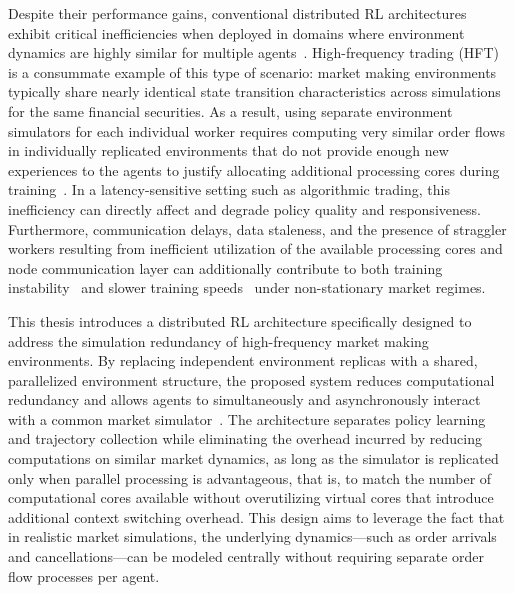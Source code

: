Despite their performance gains, conventional distributed RL architectures exhibit critical inefficiencies when
deployed in domains where environment dynamics are highly similar for multiple agents~\citep{AlSaffar2023,Lu2024}.
High-frequency trading (HFT) is a consummate example of this type of scenario: market making environments typically share nearly
identical state transition characteristics across simulations for the same financial securities.
As a result, using separate environment simulators for each individual worker requires computing very similar order flows 
in individually replicated environments that do not provide enough new experiences to the agents 
to justify allocating additional processing cores during training~\citep{Hou2025}.
In a latency-sensitive setting such as algorithmic trading, 
this inefficiency can directly affect and degrade policy quality and responsiveness.
Furthermore, communication delays, data staleness, and the presence of straggler workers 
resulting from inefficient utilization of the available processing cores and node communication layer
can additionally contribute to both training instability~\citep{He2022,Xie2023} 
and slower training speeds~\citep{Borzilov2025} under non-stationary market regimes.

This thesis introduces a distributed RL architecture specifically designed to address the simulation 
redundancy of high-frequency market making environments.
By replacing independent environment replicas with a shared, parallelized environment structure,
the proposed system reduces computational redundancy and allows agents to simultaneously and 
asynchronously interact with a common market simulator~\citep{Yin2024,Hou2025}.
The architecture separates policy learning and trajectory collection while eliminating the overhead 
incurred by reducing computations on similar market dynamics, 
as long as the simulator is replicated only when parallel processing is advantageous, that is,
to match the number of computational cores available without overutilizing virtual cores that introduce additional context switching overhead.
This design aims to leverage the fact that in realistic market simulations, 
the underlying dynamics---such as order arrivals and cancellations---can 
be modeled centrally without requiring separate order flow processes per agent.

